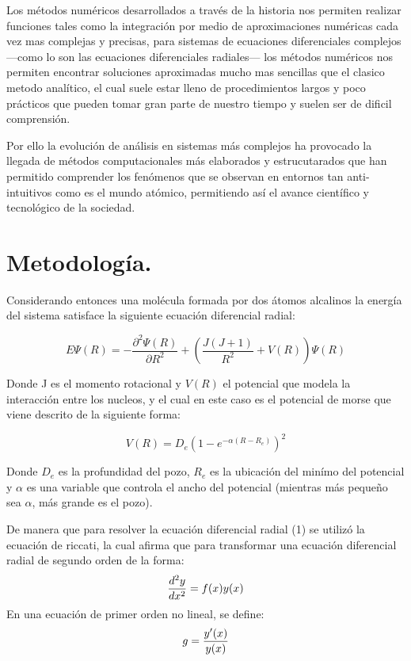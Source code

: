 \documentclass[twocolumn,preprintnumbers,amsmath,amssymb,aps,prl]{revtex4}
\begin{document}
Los métodos numéricos desarrollados a través de la historia nos permiten realizar funciones tales como la integración por medio de aproximaciones numéricas cada vez mas complejas y precisas, para sistemas de ecuaciones diferenciales complejos —como lo son las ecuaciones diferenciales radiales— los métodos numéricos nos permiten encontrar soluciones aproximadas mucho mas sencillas que el clasico metodo analítico, el cual suele estar lleno de procedimientos largos y poco prácticos que pueden tomar gran parte de nuestro tiempo y suelen ser de dificil comprensión.

Por ello la evolución de análisis en sistemas más complejos ha provocado la llegada de métodos computacionales más elaborados y estrucutarados que han permitido comprender los fenómenos que se observan en entornos tan anti-intuitivos como es el mundo atómico, permitiendo así el avance científico y tecnológico de la sociedad.

\section{Metodología.}

Considerando entonces una molécula formada por dos átomos alcalinos la energía del sistema satisface la siguiente ecuación diferencial radial:

\begin{equation}\label{E1}
    E\Psi(R)=-\frac{\partial^2\Psi(R)}{\partial R^2}+\left(\frac{J(J+1)}{R^2}+V(R)\right)\Psi(R)
\end{equation}

Donde J es el momento rotacional y $V(R)$ el potencial que modela la interacción entre los nucleos, y el cual en este caso es el potencial de morse que viene descrito de la siguiente forma:

\begin{equation}
    V(R)=D_e\left(1-e^{-\alpha(R-R_e)}\right)^2
\end{equation}

Donde $D_e$ es la profundidad del pozo, $R_e$ es la ubicación del minímo del potencial y $\alpha$ es una variable que controla el ancho del potencial (mientras más pequeño sea $\alpha $, más grande es el pozo).

De manera que para resolver la ecuación diferencial radial (1) se utilizó la ecuación de riccati, la cual afirma que para transformar una ecuación diferencial radial de segundo orden de la forma:
\begin{equation}\notag
    \frac{d^2y}{dx^2}=f(x)y(x)
\end{equation}
En una ecuación de primer orden no lineal, se define:
\begin{equation}\notag
    g=\frac{y'(x)}{y(x)}
\end{equation}
\end{document}
